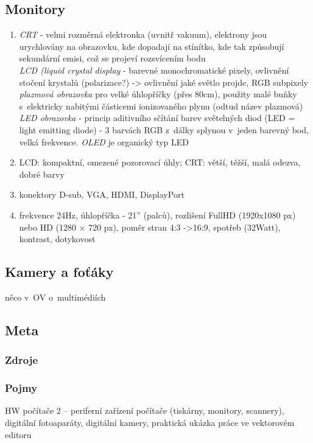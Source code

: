 \documentclass[12pt]{article}
\begin{document}
\subsection{Monitory}
\begin{enumerate}
\item \emph{CRT} - velmi rozměrná elektronka (uvnitř vakuum), elektrony jsou urychlovány na obrazovku, kde dopadají na stínítko, kde tak způsobují sekundární emisi, což se projeví rozsvícením bodu\\
\emph{LCD (liquid crystal display} - barevné monochromatické pixely, ovlivnění stočení krystalů (polarizace?) -> ovlivnění jaké světlo projde, RGB subpixely\\
\emph{plazmová obrazovka} pro velké úhlopříčky (přes 80cm), použity malé buňky s~elektricky nabitými částicemi ionizovaného plynu (odtud název plazmová)\\
\emph{LED obrazovka} - princip aditivního sčítání barev světelných diod (LED = light emitting diode) - 3 barvách RGB z~dálky splynou v~jeden barevný bod, velká frekvence. \emph{OLED} je organický typ LED
\item LCD: kompaktní, omezené pozorovací úhly;
CRT: větší, těžší, malá odezva, dobré barvy
\item konektory D-sub, VGA, HDMI, DisplayPort
\item frekvence 24Hz, úhlopříčka - 21'' (palců), rozlišení FullHD (1920x1080 px) nebo HD (1280 $\times$ 720 px), poměr stran 4:3 ->16:9, spotřeb (32Watt), kontrast, dotykovost
\end{enumerate}
\subsection{Kamery a foťáky}
něco v~OV o~multimédiích
\subsection{Meta}
\subsubsection{Zdroje}
\subsubsection{Pojmy}
HW počítače 2 – periferní zařízení počítače (tiskárny, monitory, scannery), digitální fotoaparáty, digitální kamery, praktická ukázka práce ve vektorovém editoru
\end{document}
